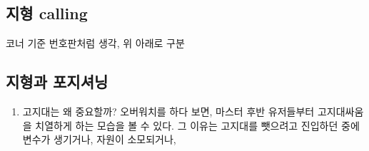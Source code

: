 \subsection{지형 calling}
코너 기준 번호판처럼 생각, 위 아래로 구분
\subsection{지형과 포지셔닝}
\begin{enumerate}
    \item 고지대는 왜 중요할까?
     오버워치를 하다 보면, 마스터 후반 유저들부터 고지대싸움을 치열하게 하는 모습을 볼 수 있다.
     그 이유는 고지대를 뺏으려고 진입하던 중에 변수가 생기거나, 자원이 소모되거나, 
\end{enumerate}

 
